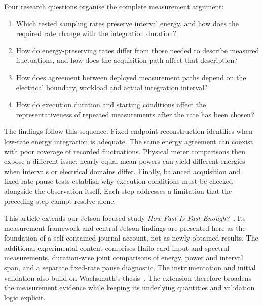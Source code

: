 Four research questions organise the complete measurement argument:
\begin{enumerate}
\item[\textbf{RQ1:}] Which tested sampling rates preserve interval energy, and how does the required rate change with the integration duration?
\item[\textbf{RQ2:}] How do energy-preserving rates differ from those needed to describe measured fluctuations, and how does the acquisition path affect that description?
\item[\textbf{RQ3:}] How does agreement between deployed measurement paths depend on the electrical boundary, workload and actual integration interval?
\item[\textbf{RQ4:}] How do execution duration and starting conditions affect the representativeness of repeated measurements after the rate has been chosen?
\end{enumerate}

The findings follow this sequence. Fixed-endpoint reconstruction identifies when low-rate energy integration is adequate. The same energy agreement can coexist with poor coverage of recorded fluctuations. Physical meter comparisons then expose a different issue: nearly equal mean powers can yield different energies when intervals or electrical domains differ. Finally, balanced acquisition and fixed-rate pause tests establish why execution conditions must be checked alongside the observation itself. Each step addresses a limitation that the preceding step cannot resolve alone.

This article extends our Jetson-focused study \emph{How Fast Is Fast Enough?}~\cite{mika2026workshopdraft}. Its measurement framework and central Jetson findings are presented here as the foundation of a self-contained journal account, not as newly obtained results. The additional experimental content comprises Hailo card-input and spectral measurements, duration-wise joint comparisons of energy, power and interval span, and a separate fixed-rate pause diagnostic. The instrumentation and initial validation also build on Wachsmuth's thesis~\cite{wachsmuth2026thesis}. The extension therefore broadens the measurement evidence while keeping its underlying quantities and validation logic explicit.
